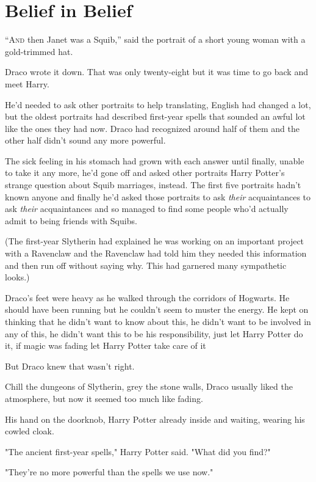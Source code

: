 \chapter{Belief in Belief}

\lettrine{“A}{nd} then Janet was a Squib,'' said the portrait of a short young woman with a
gold-trimmed hat.

Draco wrote it down. That was only twenty-eight but it was time to go back and
meet Harry.

He'd needed to ask other portraits to help translating, English had changed a
lot, but the oldest portraits had described first-year spells that sounded an
awful lot like the ones they had now. Draco had recognized around half of them
and the other half didn't sound any more powerful.

The sick feeling in his stomach had grown with each answer until finally,
unable to take it any more, he'd gone off and asked other portraits Harry
Potter's strange question about Squib marriages, instead. The first five
portraits hadn't known anyone and finally he'd asked those portraits to ask
\emph{their} acquaintances to ask \emph{their} acquaintances and so managed to
find some people who'd actually admit to being friends with Squibs.

(The first-year Slytherin had explained he was working on an important project
with a Ravenclaw and the Ravenclaw had told him they needed this information
and then run off without saying why. This had garnered many sympathetic looks.)

Draco's feet were heavy as he walked through the corridors of Hogwarts. He
should have been running but he couldn't seem to muster the energy. He kept on
thinking that he didn't want to know about this, he didn't want to be involved
in any of this, he didn't want this to be his responsibility, just let Harry
Potter do it, if magic was fading let Harry Potter take care of it{\el}

But Draco knew that wasn't right.

Chill the dungeons of Slytherin, grey the stone walls, Draco usually liked the
atmosphere, but now it seemed too much like fading.

His hand on the doorknob, Harry Potter already inside and waiting, wearing his
cowled cloak.

"The ancient first-year spells," Harry Potter said. "What did you find?"

"They're no more powerful than the spells we use now."

